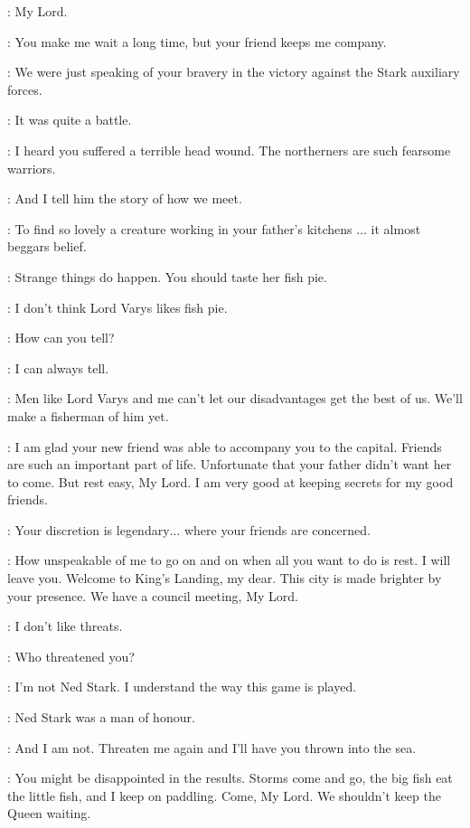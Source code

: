 \VARYS: My Lord.

\SHAE: You make me wait a long time, but your friend keeps me company.

\VARYS: We were just speaking of your bravery in the victory against the Stark auxiliary forces.

\TYRION: It was quite a battle.

\VARYS: I heard you suffered a terrible head wound. The northerners are such fearsome warriors.

\SHAE: And I tell him the story of how we meet.

\VARYS: To find so lovely a creature working in your father's kitchens $\ldots$ it almost beggars belief.

\TYRION: Strange things do happen. You should taste her fish pie.

\SHAE: I don't think Lord Varys likes fish pie.

\TYRION: How can you tell?

\SHAE: I can always tell.

\TYRION: Men like Lord Varys and me can't let our disadvantages get the best of us. We'll make a fisherman of him yet.

\VARYS: I am glad your new friend was able to accompany you to the capital. Friends are such an important part of life. Unfortunate that your father didn't want her to come. But rest easy, My Lord. I am very good at keeping secrets for my good friends.

\TYRION: Your discretion is legendary$\ldots$ where your friends are concerned.

\VARYS: How unspeakable of me to go on and on when all you want to do is rest. I will leave you. Welcome to King's Landing, my dear. This city is made brighter by your presence. We have a council meeting, My Lord.


\TYRION: I don't like threats.

\VARYS: Who threatened you?

\TYRION: I'm not Ned Stark. I understand the way this game is played.

\VARYS: Ned Stark was a man of honour.

\TYRION: And I am not. Threaten me again and I'll have you thrown into the sea.

\VARYS: You might be disappointed in the results. Storms come and go, the big fish eat the little fish, and I keep on paddling. Come, My Lord. We shouldn't keep the Queen waiting.

